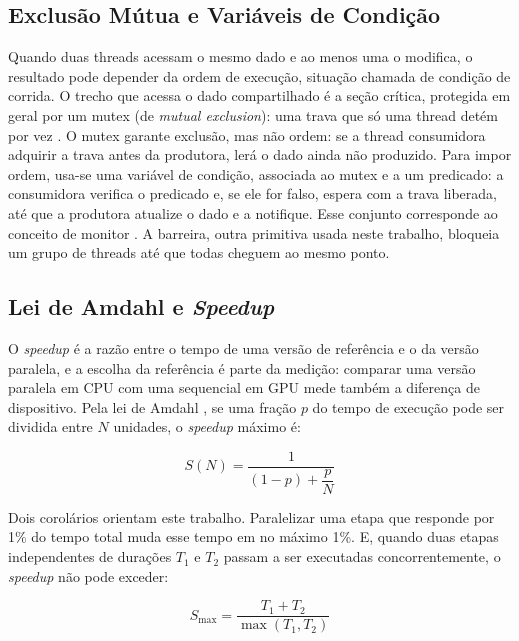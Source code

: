 \subsection{Exclusão Mútua e Variáveis de Condição}

Quando duas threads acessam o mesmo dado e ao menos uma o modifica, o resultado pode depender da ordem de execução, situação chamada de condição de corrida. O trecho que acessa o dado compartilhado é a seção crítica, protegida em geral por um mutex (de \textit{mutual exclusion}): uma trava que só uma thread detém por vez \cite{Silberschatz2018}. O mutex garante exclusão, mas não ordem: se a thread consumidora adquirir a trava antes da produtora, lerá o dado ainda não produzido. Para impor ordem, usa-se uma variável de condição, associada ao mutex e a um predicado: a consumidora verifica o predicado e, se ele for falso, espera com a trava liberada, até que a produtora atualize o dado e a notifique. Esse conjunto corresponde ao conceito de monitor \cite{Hoare1974Monitors}. A barreira, outra primitiva usada neste trabalho, bloqueia um grupo de threads até que todas cheguem ao mesmo ponto.

\subsection{Lei de Amdahl e \textit{Speedup}}

O \textit{speedup} é a razão entre o tempo de uma versão de referência e o da versão paralela, e a escolha da referência é parte da medição: comparar uma versão paralela em CPU com uma sequencial em GPU mede também a diferença de dispositivo. Pela lei de Amdahl \cite{Amdahl1967}, se uma fração $p$ do tempo de execução pode ser dividida entre $N$ unidades, o \textit{speedup} máximo é:

\begin{equation}
S(N) = \frac{1}{(1 - p) + \dfrac{p}{N}}
\end{equation}

\noindent Dois corolários orientam este trabalho. Paralelizar uma etapa que responde por 1\% do tempo total muda esse tempo em no máximo 1\%. E, quando duas etapas independentes de durações $T_1$ e $T_2$ passam a ser executadas concorrentemente, o \textit{speedup} não pode exceder:

\begin{equation}
S_{\max} = \frac{T_1 + T_2}{\max(T_1, T_2)}
\end{equation}


